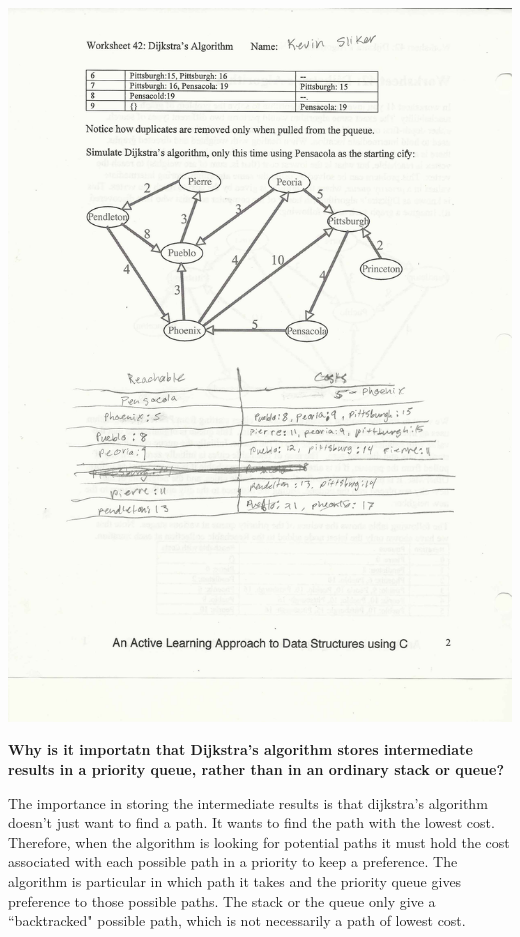 \documentclass[12pt, letterpaper]{article}
\begin{document}
\includegraphics[scale=0.7]{42}


\newpage
\noindent\textbf{Why is it importatn that Dijkstra's algorithm stores intermediate results in a priority queue, rather than in an ordinary stack or queue?}

The importance in storing the intermediate results is that dijkstra's algorithm doesn't just want to find a path. It wants to find the path with the lowest cost. Therefore, when the algorithm is looking for potential paths it must hold the cost associated with each possible path in a priority to keep a preference. The algorithm is particular in which path it takes and the priority queue gives preference to those possible paths. The stack or the queue only give a ``backtracked" possible path, which is not necessarily a path of lowest cost.
\vspace{0.2in}
\end{document}
